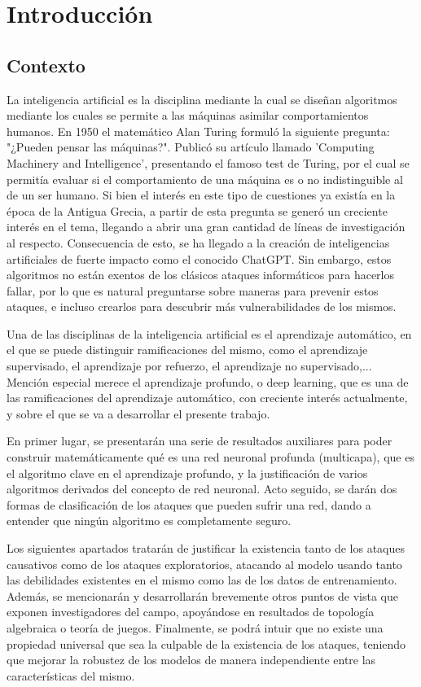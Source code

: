 
\chapter{Introducción}
\label{cap:capitulo1}
\section{Contexto}
La inteligencia artificial es la disciplina mediante la cual se diseñan algoritmos mediante los cuales se permite a las máquinas asimilar comportamientos humanos. En 1950 el matemático Alan Turing formuló la siguiente pregunta: "¿Pueden pensar las máquinas?". Publicó su artículo llamado 'Computing Machinery and Intelligence', presentando el famoso test de Turing, por el cual se permitía evaluar si el comportamiento de una máquina es o no indistinguible al de un ser humano. Si bien el interés en este tipo de cuestiones ya existía en la época de la Antigua Grecia, a partir de esta pregunta se generó un creciente interés en el tema, llegando a abrir una gran cantidad de líneas de investigación al respecto. Consecuencia de esto, se ha llegado a la creación de inteligencias artificiales de fuerte impacto como el conocido ChatGPT. Sin embargo, estos algoritmos no están exentos de los clásicos ataques informáticos para hacerlos fallar, por lo que es natural preguntarse sobre maneras para prevenir estos ataques, e incluso crearlos para descubrir más vulnerabilidades de los mismos.

Una de las disciplinas de la inteligencia artificial es el aprendizaje automático, en el que se puede distinguir ramificaciones del mismo, como el aprendizaje supervisado, el aprendizaje por refuerzo, el aprendizaje no supervisado,... Mención especial merece el aprendizaje profundo, o deep learning, que es una de las ramificaciones del aprendizaje automático, con creciente interés actualmente, y sobre el que se va a desarrollar el presente trabajo.

En primer lugar, se presentarán una serie de resultados auxiliares para poder construir matemáticamente qué es una red neuronal profunda (multicapa), que es el algoritmo clave en el aprendizaje profundo, y la justificación de varios algoritmos derivados del concepto de red neuronal. Acto seguido, se darán dos formas de clasificación de los ataques que pueden sufrir una red, dando a entender que ningún algoritmo es completamente seguro.

Los siguientes apartados tratarán de justificar la existencia tanto de los ataques causativos como de los ataques exploratorios, atacando al modelo usando tanto las debilidades existentes en el mismo como las de los datos de entrenamiento. Además, se mencionarán y desarrollarán brevemente otros puntos de vista que exponen investigadores del campo, apoyándose en resultados de topología algebraica o teoría de juegos. Finalmente, se podrá intuir que no existe una propiedad universal que sea la culpable de la existencia de los ataques, teniendo que mejorar la robustez de los modelos de manera independiente entre las características del mismo.

